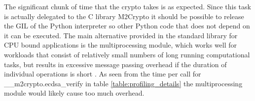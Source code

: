 The significant chunk of time that the crypto takes is as expected.
Since this task is actually delegated to the C library M2Crypto it should be possible to release the GIL of the Python interpreter so other Python code that does not depend on it can be executed.
The main alternative provided in the standard library for CPU bound applications is the multiprocessing module, which works well for workloads that consist of relatively small numbers of long running computational tasks, but results in excessive message passing overhead if the duration of individual operations is short \cite{http://python-notes.curiousefficiency.org/en/latest/python3/multicore_python.html}.
As seen from the time per call for \_\_m2crypto.ecdsa\_verify in table \ref{table:profiling_details} the multiprocessing module would likely cause too much overhead.


